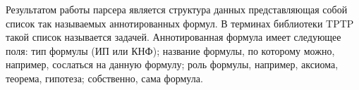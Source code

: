 \documentclass[a4paper]{jctart15b}
\begin{document}
Результатом работы парсера является структура данных представляющая собой список так называемых аннотированных формул. В терминах библиотеки TPTP такой список называется задачей. Аннотированная формула имеет следующее поля: тип формулы (ИП или КНФ); название формулы, по которому можно, например, сослаться на данную формулу; роль формулы, например, аксиома, теорема, гипотеза; собственно, сама формула.







\end{document}
